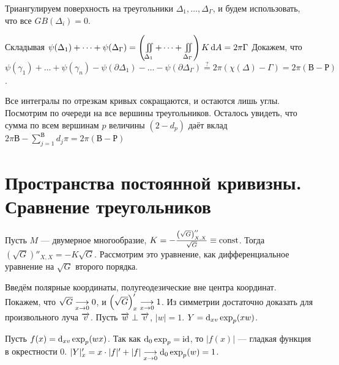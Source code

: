 \documentclass[a4paper]{report}
\begin{document}
{{    Триангулируем поверхность на треугольники $\Delta_1, \dots, \Delta_\Gamma$, и будем использовать, что все $GB(\Delta_i) = 0$.

    Складывая $\psi(\Delta_1) + \dots + \psi(\Delta_\Gamma) = \left(\iint\limits_{\Delta_1} + \dots + \iint\limits_{\Delta_\Gamma}\right)K\operatorname{d}\! A = 2\pi \Gamma$
    Докажем, что $\psi(\gamma_1) + \dots + \psi(\gamma_n) - \psi(\partial \Delta_1) - \dots - \psi(\partial \Delta_\Gamma) \overset{?}= 2\pi(\chi(\Delta) - \Gamma) = 2\pi(\text{В} - \text{Р})$.

    Все интегралы по отрезкам кривых сокращаются, и остаются лишь углы.
        Посмотрим по очереди на все вершины треугольников.
    Осталось увидеть, что сумма по всем вершинам $p$ величины $(2 - d_p)$ даёт вклад $2\pi\text{В} - \sum\limits_{j = 1}^{\text{В}}d_j \pi = 2\pi(\text{В} - \text{Р})$
    }
    }
    \section{Пространства постоянной кривизны. Сравнение треугольников}
    Пусть $M$ --- двумерное многообразие, $K = -\frac{\left(\sqrt{G}\right)''_{X,X}}{\sqrt{G}} \equiv \operatorname{const}$.
    Тогда $\left(\sqrt{G}\right)''_{X,X} = -K \sqrt{G}$.
    Рассмотрим это уравнение, как дифференциальное уравнение на $\sqrt{G}$ второго порядка.

    Введём полярные координаты, полугеодезические вне центра координат.
    Покажем, что $\sqrt{G} \underset{x \to 0}{\longrightarrow} 0$, и $\left(\sqrt{G}\right)'_{x} \underset{x \to 0}{\longrightarrow} 1$.
    Из симметрии достаточно доказать для произвольного луча $\overrightarrow{v}$.
    Пусть $\overrightarrow{w} \perp \overrightarrow{v}$, $|w| = 1$.
    $Y = \operatorname{d}\!_{xv} \exp_{p}(xw)$.

    Пусть $f(x) = \operatorname{d}\!_{xv}\exp_p(wx)$.
    Так как $\operatorname{d}\!_0 \exp_p = \operatorname{id}$, то $|f(x)|$ --- гладкая функция в окрестности $0$.
    $|Y|'_{x} = x \cdot |f|' + |f| \underset{x \to 0}{\longrightarrow} \operatorname{d}\!_0\exp_p(w) = 1$.
\end{document}
